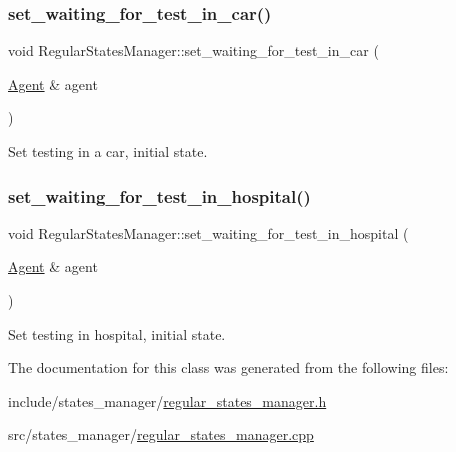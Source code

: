 \subsubsection{\texorpdfstring{set\+\_\+waiting\+\_\+for\+\_\+test\+\_\+in\+\_\+car()}{set\_waiting\_for\_test\_in\_car()}}
{\footnotesize\ttfamily void Regular\+States\+Manager\+::set\+\_\+waiting\+\_\+for\+\_\+test\+\_\+in\+\_\+car (\begin{DoxyParamCaption}\item[{\hyperlink{classAgent}{Agent} \&}]{agent }\end{DoxyParamCaption})}



Set testing in a car, initial state. 

\mbox{\label{classRegularStatesManager_adfe4e02af0388ceb0adba80867079ca7}} 
\subsubsection{\texorpdfstring{set\+\_\+waiting\+\_\+for\+\_\+test\+\_\+in\+\_\+hospital()}{set\_waiting\_for\_test\_in\_hospital()}}
{\footnotesize\ttfamily void Regular\+States\+Manager\+::set\+\_\+waiting\+\_\+for\+\_\+test\+\_\+in\+\_\+hospital (\begin{DoxyParamCaption}\item[{\hyperlink{classAgent}{Agent} \&}]{agent }\end{DoxyParamCaption})}



Set testing in hospital, initial state. 



The documentation for this class was generated from the following files\+:\begin{DoxyCompactItemize}
\item 
include/states\+\_\+manager/\hyperlink{regular__states__manager_8h}{regular\+\_\+states\+\_\+manager.\+h}\item 
src/states\+\_\+manager/\hyperlink{regular__states__manager_8cpp}{regular\+\_\+states\+\_\+manager.\+cpp}\end{DoxyCompactItemize}
